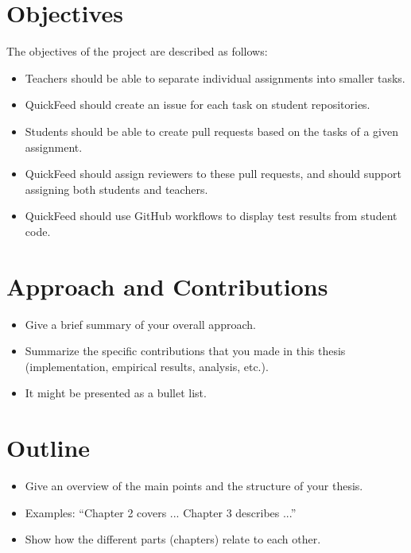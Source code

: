 \section{Objectives}

The objectives of the project are described as follows:

\begin{itemize}
    \item Teachers should be able to separate individual assignments into smaller tasks.
    \item QuickFeed should create an issue for each task on student repositories.
    \item Students should be able to create pull requests based on the tasks of a given assignment.
    \item QuickFeed should assign reviewers to these pull requests, and should support assigning both students and teachers.
    \item QuickFeed should use GitHub workflows to display test results from student code.
\end{itemize}

\section{Approach and Contributions}

\begin{itemize}
\item Give a brief summary of your overall approach.
\item Summarize the specific contributions that you made in this thesis (implementation, empirical results, analysis, etc.).
\item It might be presented as a bullet list.
\end{itemize}


\section{Outline}

\begin{itemize}
\item Give an overview of the main points and the structure of your thesis.
\item Examples: ``Chapter 2 covers ...  Chapter 3 describes ...''
\item Show how the different parts (chapters) relate to each other.
\end{itemize}
